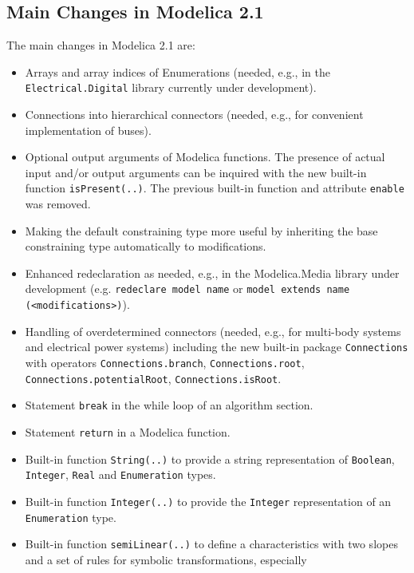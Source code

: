 \subsection{Main Changes in Modelica 2.1}

The main changes in Modelica 2.1 are:

\begin{itemize}
\item
  Arrays and array indices of Enumerations (needed, e.g., in the
  \lstinline!Electrical.Digital! library currently under development).
\item
  Connections into hierarchical connectors (needed, e.g., for convenient
  implementation of buses).
\item
  Optional output arguments of Modelica functions. The presence of
  actual input and/or output arguments can be inquired with the new
  built-in function \lstinline!isPresent(..)!. The previous built-in function and
  attribute \lstinline!enable! was removed.
\item
  Making the default constraining type more useful by inheriting the
  base constraining type automatically to modifications.
\item
  Enhanced redeclaration as needed, e.g., in the Modelica.Media library
  under development (e.g. \lstinline!redeclare model name! or \lstinline!model extends name (<modifications>)!).
\item
  Handling of overdetermined connectors (needed, e.g., for multi-body
  systems and electrical power systems) including the new built-in
  package \lstinline!Connections! with operators \lstinline!Connections.branch!,
  \lstinline!Connections.root!, \lstinline!Connections.potentialRoot!, \lstinline!Connections.isRoot!.
\item
  Statement \lstinline!break! in the while loop of an algorithm section.
\item
  Statement \lstinline!return! in a Modelica function.
\item
  Built-in function \lstinline!String(..)! to provide a string representation of
  \lstinline!Boolean!, \lstinline!Integer!, \lstinline!Real! and \lstinline!Enumeration! types.
\item
  Built-in function \lstinline!Integer(..)! to provide the \lstinline!Integer! representation of
  an \lstinline!Enumeration! type.
\item
  Built-in function \lstinline!semiLinear(..)! to define a characteristics with two
  slopes and a set of rules for symbolic transformations, especially

\end{itemize}

